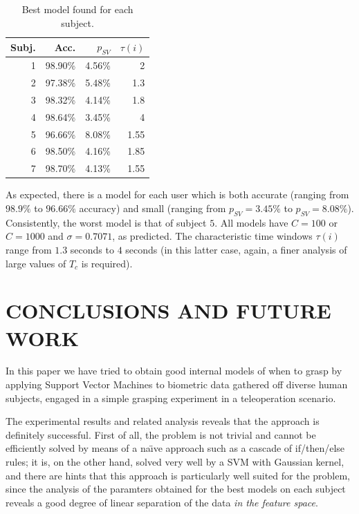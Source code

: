 \documentclass[a4paper,10pt,conference]{ieeeconf}
\begin{document}
\begin{table}[!t]
  \begin{center}
    \caption{Best model found for each subject.}
    \begin{tabular}{|r|r|r|r|}
      \hline
      Subj. & Acc. & $p_{SV}$ & $\tau(i)$ \\
      \hline
      1 & 98.90\% & 4.56\% & 2   \\
      2 & 97.38\% & 5.48\% & 1.3 \\
      3 & 98.32\% & 4.14\% & 1.8 \\
      4 & 98.64\% & 3.45\% & 4   \\
      5 & 96.66\% & 8.08\% & 1.55\\
      6 & 98.50\% & 4.16\% & 1.85\\
      7 & 98.70\% & 4.13\% & 1.55\\
      \hline
    \end{tabular}
    \label{tab:tau}
  \end{center}
\end{table}

As expected, there is a model for each user which is both accurate
(ranging from $98.9\%$ to $96.66\%$ accuracy) and small (ranging from
$p_{SV}=3.45\%$ to $p_{SV}=8.08\%$). Consistently, the worst model is
that of subject $5$. All models have $C=100$ or $C=1000$ and
$\sigma=0.7071$, as predicted. The characteristic time windows
$\tau(i)$ range from $1.3$ seconds to $4$ seconds (in this latter
case, again, a finer analysis of large values of $T_c$ is required).

\section{CONCLUSIONS AND FUTURE WORK}
\label{sec:con}

In this paper we have tried to obtain good internal models of when to
grasp by applying Support Vector Machines to biometric data gathered
off diverse human subjects, engaged in a simple grasping experiment in
a teleoperation scenario.

The experimental results and related analysis reveals that the
approach is definitely successful. First of all, the problem is not
trivial and cannot be efficiently solved by means of a na\"\i ve
approach such as a cascade of if/then/else rules; it is, on the other
hand, solved very well by a SVM with Gaussian kernel, and there are
hints that this approach is particularly well suited for the problem,
since the analysis of the paramters obtained for the best models on
each subject reveals a good degree of linear separation of the data
\emph{in the feature space}.
\end{document}
